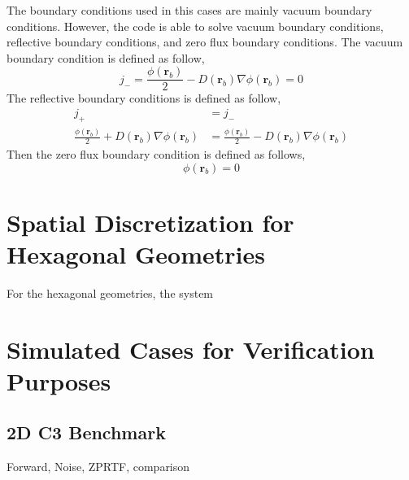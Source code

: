 The boundary conditions used in this cases are mainly vacuum boundary conditions. However, the code is able to solve vacuum boundary conditions, reflective boundary conditions, and zero flux boundary conditions. The vacuum boundary condition is defined as follow,
\begin{equation}
        j_- = \frac{\phi(\textbf{r}_b)}{2} - D(\textbf{r}_b) \nabla \phi(\textbf{r}_b) = 0
\end{equation}
The reflective boundary conditions is defined as follow,
\begin{equation}
        \begin{aligned}
                j_+  &= j_-\\
                \frac{\phi(\textbf{r}_b)}{2} + D(\textbf{r}_b) \nabla \phi(\textbf{r}_b) &= \frac{\phi(\textbf{r}_b)}{2} - D(\textbf{r}_b) \nabla \phi(\textbf{r}_b)
        \end{aligned}
\end{equation}
Then the zero flux boundary condition is defined as follows,
\begin{equation}
        \phi(\textbf{r}_b) = 0
\end{equation}

\section{Spatial Discretization for Hexagonal Geometries}
\label{sec:hexagonal_discretization}
For the hexagonal geometries, the system 

\section{Simulated Cases for Verification Purposes}
\label{sec:simulated_vandv}

\subsection{2D C3 Benchmark}
Forward, Noise, ZPRTF, comparison

